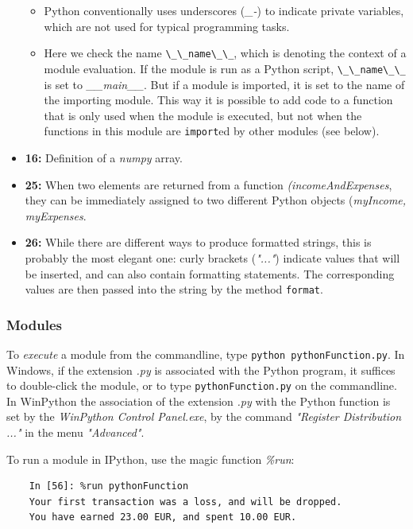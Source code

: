 \begin{itemize}
\begin{itemize}
        \item Python conventionally uses underscores (\emph{\_-}) to indicate private variables, which are not used for typical programming tasks.
        \item Here we check the name \lstinline{\_\_name\_\_}, which is denoting the context of a module evaluation. If the module is run as a Python script, \lstinline{\_\_name\_\_} is set to \emph{\_\_main\_\_}. But if a module is imported, it is set to the name of the importing module. This way it is possible to add code to a function that is only used when the module is executed, but not when the functions in this module are \lstinline{import}ed by other modules (see below).
      \end{itemize}
  \item \textbf{16:} Definition of a \emph{numpy} array.
  \item \textbf{25:} When two elements are returned from a function \emph{(incomeAndExpenses}, they can be immediately assigned to two different Python objects (\emph{myIncome, myExpenses}.
  \item \textbf{26:} While there are different ways to produce formatted strings, this is probably the most elegant one: curly brackets (\emph{"{...}"}) indicate values that will be inserted, and can also contain formatting statements. The corresponding values are then passed into the string by the method \lstinline{format}.
\end{itemize}

\subsubsection{Modules}

To \emph{execute} a module from the commandline, type \lstinline{python pythonFunction.py}. In Windows, if the extension \emph{.py} is associated with the Python program, it suffices to double-click the module, or to type \lstinline{pythonFunction.py} on the commandline. In WinPython the association of the extension \emph{.py} with the Python function is set by the \emph{WinPython Control Panel.exe}, by the command \emph{"Register Distribution ..."} in the menu \emph{"Advanced"}.

To run a module in IPython, use the magic function \emph{\%run}:

\begin{lstlisting}
    In [56]: %run pythonFunction
    Your first transaction was a loss, and will be dropped.
    You have earned 23.00 EUR, and spent 10.00 EUR.
\end{lstlisting}

